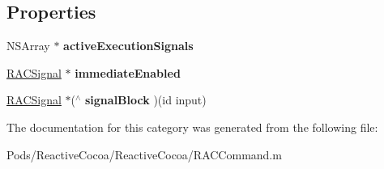 \subsection*{Properties}
\begin{DoxyCompactItemize}
\item 
\mbox{\label{category_r_a_c_command_07_08_aafb53264ea1ae025a5389fd389321019}} 
N\+S\+Array $\ast$ {\bfseries active\+Execution\+Signals}
\item 
\mbox{\label{category_r_a_c_command_07_08_a7ca510ffc0e9619542e6ffb5751a9d0d}} 
\mbox{\hyperlink{interface_r_a_c_signal}{R\+A\+C\+Signal}} $\ast$ {\bfseries immediate\+Enabled}
\item 
\mbox{\label{category_r_a_c_command_07_08_af623d322ffb70d7f8e0167cb20467e7e}} 
\mbox{\hyperlink{interface_r_a_c_signal}{R\+A\+C\+Signal}} $\ast$($^\wedge$ {\bfseries signal\+Block} )(id input)
\end{DoxyCompactItemize}


The documentation for this category was generated from the following file\+:\begin{DoxyCompactItemize}
\item 
Pods/\+Reactive\+Cocoa/\+Reactive\+Cocoa/R\+A\+C\+Command.\+m\end{DoxyCompactItemize}
